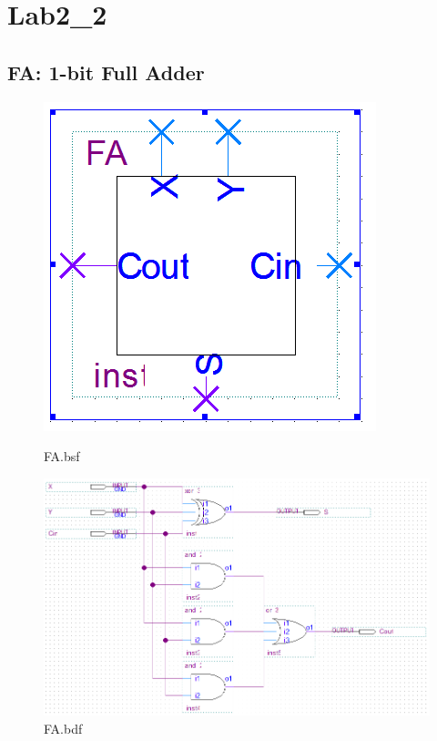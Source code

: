 \documentclass[12pt,a4paper]{article}
\begin{document}
  \section{Lab2\_2}
  \subsection{FA: 1-bit Full Adder}
  \begin{figure}[H]
    \centering
    \begin{subcaptionblock}{0.15\linewidth}
      \includegraphics[width=\linewidth]{Lab2_2/FA_bsf.png}
      \caption{FA.bsf}
    \end{subcaptionblock}
    \begin{subcaptionblock}{0.84\linewidth}
      \includegraphics[width=\linewidth]{Lab2_2/FA_bdf.png}
      \caption{FA.bdf}
    \end{subcaptionblock}
  \end{figure}
\end{document}
